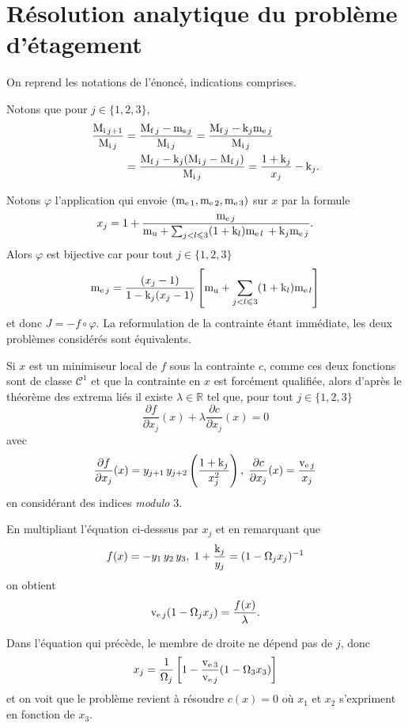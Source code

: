\section{Résolution analytique du problème d'étagement}

On reprend les notations de l'énoncé, indications comprises.

\question Notons que pour $j\in\{1,2,3\}$,
\begin{align*}
\dfrac{\initmass{j+1}}{\initmass{j}} &= \dfrac{\finalmass{j}-\massstruct{j}}{\initmass{j}} =%
\dfrac{\finalmass{j}-\constructidx{j}\masspropel{j}}{\initmass{j}} \\ &= \dfrac{\finalmass{j}-\constructidx{j}(\initmass{j}-\finalmass{j})}{\initmass{j}} = \dfrac{1+\constructidx{j}}{x_{j}}-\constructidx{j}\text{.}
\end{align*}

Notons $\varphi$ l'application qui envoie $(\mathrm{m}_{\mathrm{e}\,1},\mathrm{m}_{\mathrm{e}\,2},\mathrm{m}_{\mathrm{e}\,3})$ sur $x$ par la formule
\[x_{j} = 1 + \dfrac{\mathrm{m}_{\mathrm{e}\,j}}{\mathrm{m}_{\mathrm{u}} + \sum_{j<l\leqslant 3}(1+\mathrm{k}_{l})\mathrm{m}_{\mathrm{e}\,l} \,+ \mathrm{k}_{j}\mathrm{m}_{\mathrm{e}\,j}}\text{.}\]
Alors $\varphi$ est bijective car pour tout $j\in\{1,2,3\}$
\[\mathrm{m}_{\mathrm{e}\,j}=\dfrac{(x_{j}-1)}{1-\mathrm{k}_{j}(x_{j}-1)}\left[\mathrm{m}_{\mathrm{u}} + \sum_{j<l\leqslant 3}(1+\mathrm{k}_{l})\mathrm{m}_{\mathrm{e}\,l}\right]\]
et donc $J=-f\circ \varphi$. La reformulation de la contrainte étant immédiate, les deux problèmes considérés sont équivalents.

\question Si $x$ est un minimiseur local de $f$ sous la contrainte $c$, comme ces deux fonctions sont de classe $\mathscr{C}^1$ et que la contrainte en $x$ est forcément qualifiée, alors d'après le théorème des extrema liés il existe $\lambda\in\mathbb{R}$ tel que, pour tout $j\in\{1,2,3\}$
\[\dfrac{\partial f}{\partial x_{j}}(x) + \lambda\dfrac{\partial c}{\partial x_{j}}(x) = 0\]
avec
\[\dfrac{\partial f}{\partial x_{j}}(x) = y_{j+1}\,y_{j+2}\left(\dfrac{1+\constructidx{j}}{x_{j}^{2}}\right)%
,\; \dfrac{\partial c}{\partial x_{j}}(x) = \dfrac{\propellantsvlct{j}}{x_{j}}\]
en considérant des indices \emph{modulo} $3$.

En multipliant l'équation ci-desssus par $x_j$ et en remarquant que
\[f(x)=-y_{1}\,y_{2}\,y_{3},\; 1+\dfrac{\mathrm{k}_{j}}{y_{j}}=(1-\Omega_{j}x_{j})^{-1}\]
on obtient
\[\mathrm{v}_{\mathrm{e}\,j}(1-\Omega_{j}x_{j}) = \dfrac{f(x)}{\lambda}\text{.}\]

\question Dans l'équation qui précède, le membre de droite ne dépend pas de $j$, donc
\[x_{j} = \dfrac{1}{\Omega_{j}}\left[1-\dfrac{\mathrm{v}_{\mathrm{e}\,3}}{\mathrm{v}_{\mathrm{e}\,j}}(1-\Omega_{3}x_{3})\right]\]
et on voit que le problème revient à résoudre $c(x)=0$ où $x_1$ et $x_2$ s'expriment en fonction de $x_3$.

